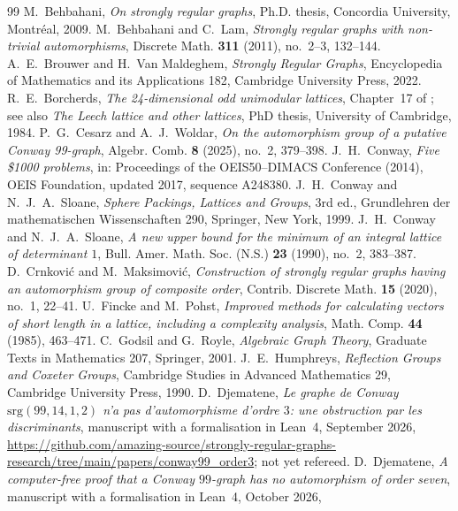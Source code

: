 \documentclass[11pt]{amsart}
\theoremstyle{definition}
\theoremstyle{remark}
\begin{document}
\begin{thebibliography}{99}
 M.~Behbahani, \emph{On strongly regular graphs}, Ph.D. thesis, Concordia University, Montr\'eal, 2009.
 M.~Behbahani and C.~Lam, \emph{Strongly regular graphs with non-trivial automorphisms}, Discrete Math.
\textbf{311} (2011), no.~2--3, 132--144.
 A.~E.~Brouwer and H.~Van Maldeghem, \emph{Strongly Regular Graphs}, Encyclopedia of Mathematics and its
Applications 182, Cambridge University Press, 2022.
 R.~E.~Borcherds, \emph{The 24-dimensional odd unimodular lattices}, Chapter~17 of \cite{SPLAG}; see also
\emph{The Leech lattice and other lattices}, PhD thesis, University of Cambridge, 1984.
 P.~G.~Cesarz and A.~J.~Woldar, \emph{On the automorphism group of a putative Conway 99-graph}, Algebr. Comb.
\textbf{8} (2025), no.~2, 379--398.
 J.~H.~Conway, \emph{Five \$1000 problems}, in: Proceedings of the OEIS50--DIMACS Conference (2014), OEIS
Foundation, updated 2017, sequence A248380.
 J.~H.~Conway and N.~J.~A.~Sloane, \emph{Sphere Packings, Lattices and Groups}, 3rd ed., Grundlehren der
mathematischen Wissenschaften 290, Springer, New York, 1999.
 J.~H.~Conway and N.~J.~A.~Sloane, \emph{A new upper bound for the minimum of an integral lattice of
determinant $1$}, Bull. Amer. Math. Soc. (N.S.) \textbf{23} (1990), no.~2, 383--387.
 D.~Crnkovi\'c and M.~Maksimovi\'c, \emph{Construction of strongly regular graphs having an automorphism group of
composite order}, Contrib. Discrete Math. \textbf{15} (2020), no.~1, 22--41.
 U.~Fincke and M.~Pohst, \emph{Improved methods for calculating vectors of short length in a lattice,
including a complexity analysis}, Math. Comp. \textbf{44} (1985), 463--471.
 C.~Godsil and G.~Royle, \emph{Algebraic Graph Theory}, Graduate Texts in Mathematics 207, Springer, 2001.
 J.~E.~Humphreys, \emph{Reflection Groups and Coxeter Groups}, Cambridge Studies in Advanced Mathematics 29,
Cambridge University Press, 1990.
 D.~Djematene, \emph{Le graphe de Conway $\mathrm{srg}(99,14,1,2)$ n'a pas
d'automorphisme d'ordre $3$: une obstruction par les discriminants}, manuscript with a formalisation in Lean~4, September
2026, \url{https://github.com/amazing-source/strongly-regular-graphs-research/tree/main/papers/conway99_order3}; not yet refereed.
 D.~Djematene, \emph{A computer-free proof that a Conway $99$-graph has no
automorphism of order seven}, manuscript with a formalisation in Lean~4, October 2026,

\end{thebibliography}
\end{document}
